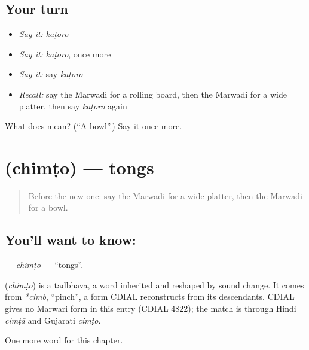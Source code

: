 \subsection*{Your turn}
\begin{itemize}
\raggedright
  \item \emph{Say it:} \emph{kaṭoro}
  \item \emph{Say it:} \emph{kaṭoro}, once more
  \item \emph{Say it:} say \emph{kaṭoro}
  \item \emph{Recall:} say the Marwadi for a rolling board, then the Marwadi for a wide platter, then say \emph{kaṭoro} again
\end{itemize}

\begin{tcolorbox}[breakable,colback=teal!4,colframe=teal!35!black,title={Before you move on}]
What does  mean? (\textquotedblleft{}A bowl\textquotedblright{}.) Say it once more.
\end{tcolorbox}
\section[\texorpdfstring{\mw{चिमटो} (chimṭo)}{चिमटो (chimṭo)}]{ (chimṭo) — tongs}

\label{lesson:MW-C121-chimto}



\begin{quote}
Before the new one: say the Marwadi for a wide platter, then the Marwadi for a bowl.
\end{quote}

\subsection*{You'll want to know: }
\textbf{} — \emph{chimṭo} — \textquotedblleft{}tongs\textquotedblright{}.

\begin{cousinweb}
\textbf{} (\emph{chimṭo}) is a tadbhava, a word inherited and reshaped by sound change. It comes from \emph{*cimb}, \textquotedblleft{}pinch\textquotedblright{}, a form CDIAL reconstructs from its descendants. CDIAL gives no Marwari form in this entry (CDIAL 4822); the match is through Hindi \emph{cimṭā} and Gujarati \emph{cimṭo}.
\end{cousinweb}

\begin{grammarlens}[title={What you've built}]
One more word for this chapter.
\end{grammarlens}

